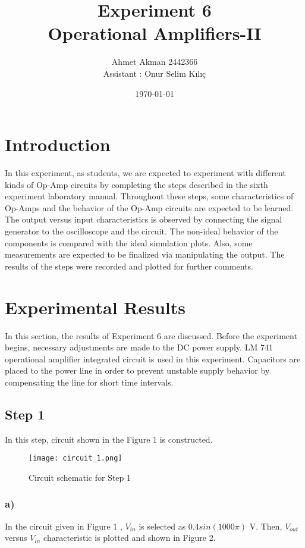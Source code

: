 \documentclass[letterpaper,12pt]{article}
\begin{document}
\title{Experiment 6 \protect\\Operational Amplifiers-II}
\author{Ahmet Akman 2442366 \protect\\ Assistant : Onur Selim Kılıç}
\date{\today}
\maketitle
\newpage
\tableofcontents
\newpage

\section{Introduction} 
In this experiment, as students, we are expected to experiment with different kinds of Op-Amp circuits by completing the steps described in the sixth experiment laboratory manual. Throughout these steps, some characteristics of Op-Amps and the behavior of the Op-Amp circuits are expected to be learned. The output versus input characteristics is observed by connecting the signal generator to the oscilloscope and the circuit. The non-ideal behavior of the components is compared with the ideal simulation plots. Also, some measurements are expected to be finalized via manipulating the output. The results of the steps were recorded and plotted for further comments.
\section{Experimental Results}
In this section, the results of Experiment 6 are discussed. Before the experiment begins, necessary adjustments are made to the DC power supply. LM 741 operational amplifier integrated circuit is used in this experiment. Capacitors are placed to the power line in order to prevent unstable supply behavior by compensating the line for short time intervals.
\subsection{Step 1}
In this step, circuit shown in the Figure 1  is constructed. 
\begin{figure}[H]
	\centering
   \texttt{[image: circuit\_1.png]}
   \caption{Circuit schematic for Step 1}
\end{figure}

\subsubsection{a)}
In the circuit given in Figure 1 , \(V_{in}\) is selected as \(0.4sin(1000\pi)\) V. Then, \(V_{out}\) versus \(V_{in}\) characteristic is plotted and shown in Figure 2. 
\end{document}
